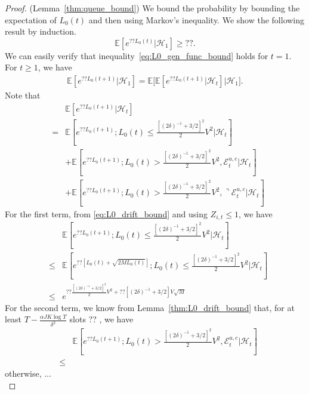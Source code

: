 \begin{proof}(Lemma~\ref{thm:queue_bound}) We bound the probability by bounding the expectation of $L_0(t)$ and then using Markov's inequality.
We show the following result by induction.  
\begin{equation} \label{eq:L0_gen_func_bound}
\mathbb{E}[e^{?? L_0(t)}|\mathcal{H}_1] \geq ??.
\end{equation}
We can easily verify that inequality~\eqref{eq:L0_gen_func_bound} holds for $t = 1$. For $t \geq 1$, we have
\begin{eqnarray} 
\mathbb{E}[e^{?? L_0(t+1)}|\mathcal{H}_1]  =  \mathbb{E}\big[\mathbb{E}[e^{?? L_0(t+1)}|\mathcal{H}_{t}]\big|\mathcal{H}_1\big].
\end{eqnarray}
Note that
\begin{eqnarray}
&&\mathbb{E}[e^{?? L_0(t+1)}|\mathcal{H}_{t}] \nonumber \\
&=& \mathbb{E}[e^{?? L_0(t+1)}; L_0(t) \leq \frac{[(2\delta)^{-1} + 3/2]^2}{2} V^2|\mathcal{H}_{t}]  \nonumber \\
&& + \mathbb{E}[e^{?? L_0(t+1)}; L_0(t) > \frac{[(2\delta)^{-1} + 3/2]^2}{2} V^2, \mathcal{E}^{u,c}_t |\mathcal{H}_{t}] \nonumber \\
&& + \mathbb{E}[e^{?? L_0(t+1)}; L_0(t) > \frac{[(2\delta)^{-1} + 3/2]^2}{2} V^2, \urcorner \mathcal{E}^{u,c}_t |\mathcal{H}_{t}] \nonumber
\end{eqnarray}
For the first term, from \eqref{eq:L0_drift_bound} and using $Z_{i,t} \leq 1$, we have
\begin{eqnarray}
&&\mathbb{E}[e^{?? L_0(t+1)}; L_0(t) \leq \frac{[(2\delta)^{-1} + 3/2]^2}{2} V^2|\mathcal{H}_{t}]  \nonumber \\
&\leq & \mathbb{E}[e^{?? [L_0(t) + \sqrt{2M L_0(t)}]}; L_0(t) \leq \frac{[(2\delta)^{-1} + 3/2]^2}{2} V^2|\mathcal{H}_{t}]  \nonumber \\
&\leq & e^{?? \frac{[(2\delta)^{-1} + 3/2]^2}{2} V^2 + ??[(2\delta)^{-1} + 3/2]V\sqrt{M}}
\end{eqnarray}
For the second term, we know from Lemma~\ref{thm:L0_drift_bound} that, for at least $T - \frac{\alpha JK \log T}{\delta^2}$ slots ?? , we have
\begin{eqnarray}
&&\mathbb{E}[e^{?? L_0(t+1)}; L_0(t) > \frac{[(2\delta)^{-1} + 3/2]^2}{2} V^2, \mathcal{E}^{u,c}_t |\mathcal{H}_{t}] \nonumber \\
&\leq& \nonumber
\end{eqnarray}
otherwise, ...\\

\end{proof}

